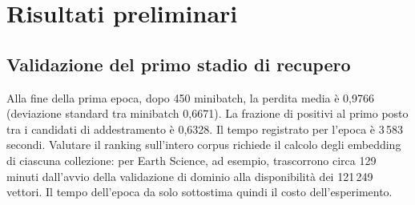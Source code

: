 \section{Risultati preliminari}
\subsection{Validazione del primo stadio di recupero}
Alla fine della prima epoca, dopo 450 minibatch, la perdita media è 0,9766 (deviazione standard tra minibatch 0,6671). La frazione di positivi al primo posto tra i candidati di addestramento è 0,6328. Il tempo registrato per l'epoca è 3\,583 secondi. Valutare il ranking sull'intero corpus richiede il calcolo degli embedding di ciascuna collezione: per Earth Science, ad esempio, trascorrono circa 129 minuti dall'avvio della validazione di dominio alla disponibilità dei 121\,249 vettori. Il tempo dell'epoca da solo sottostima quindi il costo dell'esperimento.

